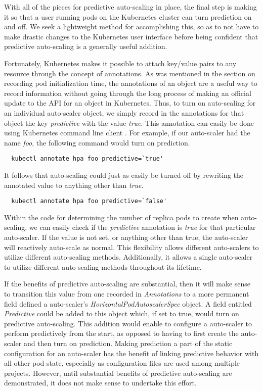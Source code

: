 With all of the pieces for predictive auto-scaling in place, the final step is
making it so that a user running pods on the Kubernetes cluster can turn
prediction on and off. We seek a lightweight method for accomplishing this, so
as to not have to make drastic changes to the Kubernetes user interface before
being confident that predictive auto-scaling is a generally useful addition.

Fortunately, Kubernetes makes it possible to attach key/value pairs to any
resource through the concept of annotations. As was mentioned in the section on
recording pod initialization time, the annotations of an object are a useful way
to record information without going through the long process of making an
official update to the API for an object in Kubernetes. Thus, to turn on
auto-scaling for an individual auto-scaler object, we simply record in the annotations for
that object the key \textit{predictive} with the value \textit{true}. This
annotation can easily be done using Kubernetes command line
client \cite{k8s-kubectl-annotate}. For example,
if our auto-scaler had the name \textit{foo}, the following command would turn
on prediction.

\begin{verbatim}
  kubectl annotate hpa foo predictive=`true'
\end{verbatim}

It follows that auto-scaling could just as easily be turned off by rewriting the
annotated value to anything other than \textit{true}.

\begin{verbatim}
  kubectl annotate hpa foo predictive=`false'
\end{verbatim}

Within the code for determining the number of replica pods to create when
auto-scaling, we can easily check if the \textit{predictive} annotation is
\textit{true} for that particular auto-scaler. If the value is not set, or
anything other than true, the auto-scaler will reactively auto-scale as normal.
This flexibility allows different auto-scalers to utilize different auto-scaling
methods. Additionally, it allows a single auto-scaler to utilize different
auto-scaling methods throughout its lifetime.

If the benefits of predictive auto-scaling are substantial, then it will make
sense to transition this value from one recorded in \textit{Annotations} to a
more permanent field defined a auto-scaler's
\textit{HorizontalPodAutoscalerSpec} object. A field entitled
\textit{Predictive} could be added to this object which, if set to true, would
turn on predictive auto-scaling. This addition would enable to configure a
auto-scaler to perform predictively from the start, as opposed to having to first
create the auto-scaler and then turn on prediction. Making prediction a part of
the static configuration for an auto-scaler has the benefit of linking predictive
behavior with all other pod state, especially as configuration files are used
among multiple projects. However, until substantial benefits of predictive
auto-scaling are demonstrated, it does not make sense to undertake this effort.

